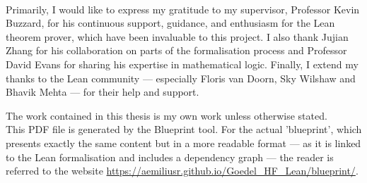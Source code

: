 \\

\noindent Primarily, I would like to express my gratitude to my supervisor, Professor Kevin Buzzard, 
for his continuous support, guidance, and enthusiasm for the Lean theorem prover, 
which have been invaluable to this project.
I also thank Jujian Zhang for his collaboration on parts of the formalisation process and 
Professor David Evans for sharing his expertise in mathematical logic. 
Finally, I extend my thanks to the Lean community — especially Floris van Doorn, Sky Wilshaw and 
Bhavik Mehta — for their help and support.




\newpage
\noindent The work contained in this thesis is my own work unless otherwise stated.\\

\noindent This PDF file is generated by the Blueprint tool.
For the actual 'blueprint', which presents exactly the same content but in a more readable format
— as it is linked to the Lean formalisation and includes a dependency graph —
the reader is referred to the website \url{https://aemiliusr.github.io/Goedel_HF_Lean/blueprint/}.

